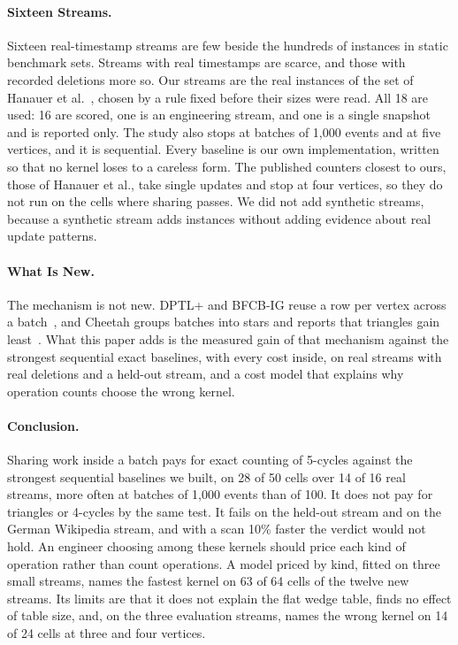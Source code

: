 \paragraph{Sixteen Streams.}
Sixteen real-timestamp streams are few beside the hundreds of instances in static benchmark sets.
Streams with real timestamps are scarce, and those with recorded deletions more so. Our streams are the real instances of the set of Hanauer et al.~\cite{hanauer-dyncount}, chosen by a rule fixed before their sizes were read. All 18 are used: 16 are scored, one is an engineering stream, and one is a single snapshot and is reported only.
The study also stops at batches of 1,000 events and at five vertices, and it is sequential.
Every baseline is our own implementation, written so that no kernel loses to a careless form. The published counters closest to ours, those of Hanauer et al., take single updates and stop at four vertices, so they do not run on the cells where sharing passes.
We did not add synthetic streams, because a synthetic stream adds instances without adding evidence about real update patterns.

\paragraph{What Is New.}
The mechanism is not new.
DPTL+ and BFCB-IG reuse a row per vertex across a batch~\cite{dptl,bfcb}, and Cheetah groups batches into stars and reports that triangles gain least~\cite{cheetah}.
What this paper adds is the measured gain of that mechanism against the strongest sequential exact baselines, with every cost inside, on real streams with real deletions and a held-out stream, and a cost model that explains why operation counts choose the wrong kernel.

\paragraph{Conclusion.}
Sharing work inside a batch pays for exact counting of 5-cycles against the strongest sequential baselines we built, on 28 of 50 cells over 14 of 16 real streams, more often at batches of 1,000 events than of 100. It does not pay for triangles or 4-cycles by the same test.
It fails on the held-out stream and on the German Wikipedia stream, and with a scan 10\% faster the verdict would not hold.
An engineer choosing among these kernels should price each kind of operation rather than count operations. A model priced by kind, fitted on three small streams, names the fastest kernel on 63 of 64 cells of the twelve new streams. Its limits are that it does not explain the flat wedge table, finds no effect of table size, and, on the three evaluation streams, names the wrong kernel on 14 of 24 cells at three and four vertices.
